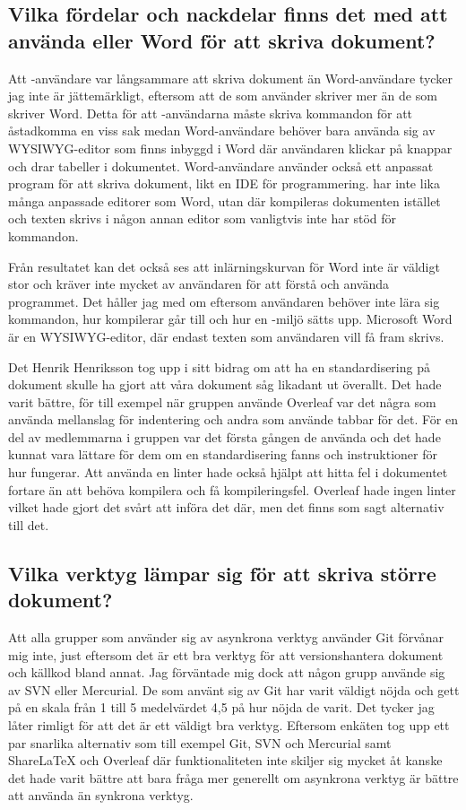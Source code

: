 \subsection{Vilka fördelar och nackdelar finns det med att använda \latex eller Word för att skriva dokument?}
Att \latex-användare var långsammare att skriva dokument än Word-användare tycker jag inte är jättemärkligt, eftersom att de som använder \latex skriver mer än de som skriver Word. Detta för att \latex-användarna måste skriva kommandon för att åstadkomma en viss sak medan Word-användare behöver bara använda sig av WYSIWYG-editor som finns inbyggd i Word där användaren klickar på knappar och drar tabeller i dokumentet. Word-användare använder också ett anpassat program för att skriva dokument, likt en IDE för programmering. \latex har inte lika många anpassade editorer som Word, utan där kompileras dokumenten istället och texten skrivs i någon annan editor som vanligtvis inte har stöd för \latex kommandon.

Från resultatet kan det också ses att inlärningskurvan för Word inte är väldigt stor och kräver inte mycket av användaren för att förstå och använda programmet. Det håller jag med om eftersom användaren behöver inte lära sig kommandon, hur kompilerar går till och hur en \latex-miljö sätts upp. Microsoft Word är en WYSIWYG-editor, där endast texten som användaren vill få fram skrivs.

Det Henrik Henriksson tog upp i sitt bidrag om att ha en standardisering på \latex dokument skulle ha gjort att våra dokument såg likadant ut överallt. Det hade varit bättre, för till exempel när gruppen använde Overleaf var det några som använda mellanslag för indentering och andra som använde tabbar för det. För en del av medlemmarna i gruppen var det första gången de använda \latex och det hade kunnat vara lättare för dem om en standardisering fanns och instruktioner för hur \latex fungerar. Att använda en linter hade också hjälpt att hitta fel i dokumentet fortare än att behöva kompilera och få kompileringsfel. Overleaf hade ingen linter vilket hade gjort det svårt att införa det där, men det finns som sagt alternativ till det.

\subsection{Vilka verktyg lämpar sig för att skriva större dokument?}
Att alla grupper som använder sig av asynkrona verktyg använder Git förvånar mig inte, just eftersom det är ett bra verktyg för att versionshantera dokument och källkod bland annat. Jag förväntade mig dock att någon grupp använde sig av SVN eller Mercurial. De som använt sig av Git har varit väldigt nöjda och gett på en skala från 1 till 5 medelvärdet 4,5 på hur nöjda de varit. Det tycker jag låter rimligt för att det är ett väldigt bra verktyg. Eftersom enkäten tog upp ett par snarlika alternativ som till exempel Git, SVN och Mercurial samt ShareLaTeX och Overleaf där funktionaliteten inte skiljer sig mycket åt kanske det hade varit bättre att bara fråga mer generellt om asynkrona verktyg är bättre att använda än synkrona verktyg.

